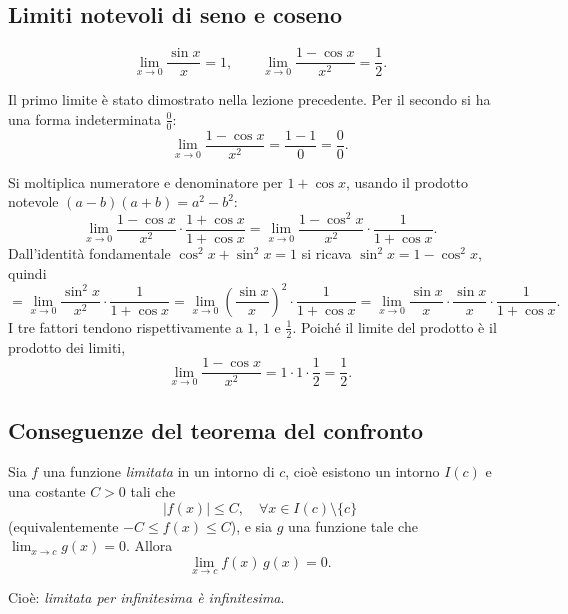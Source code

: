 \documentclass[11pt,a4paper]{article}
\begin{document}
\subsection{Limiti notevoli di seno e coseno}

\begin{teorema}
\[
  \lim_{x\to 0}\frac{\sin x}{x} = 1, \qquad \lim_{x\to 0}\frac{1 - \cos x}{x^2} = \frac{1}{2}.
\]
\end{teorema}

Il primo limite è stato dimostrato nella lezione precedente. Per il secondo si ha una forma indeterminata $\frac{0}{0}$:
\[
  \lim_{x\to 0}\frac{1 - \cos x}{x^2} = \frac{1 - 1}{0} = \frac{0}{0}.
\]

\begin{esempio}
Si moltiplica numeratore e denominatore per $1 + \cos x$, usando il prodotto notevole $(a - b)(a + b) = a^2 - b^2$:
\[
  \lim_{x\to 0}\frac{1 - \cos x}{x^2}\cdot\frac{1 + \cos x}{1 + \cos x} = \lim_{x\to 0}\frac{1 - \cos^2 x}{x^2}\cdot\frac{1}{1 + \cos x}.
\]
Dall'identità fondamentale $\cos^2 x + \sin^2 x = 1$ si ricava $\sin^2 x = 1 - \cos^2 x$, quindi
\[
  = \lim_{x\to 0}\frac{\sin^2 x}{x^2}\cdot\frac{1}{1 + \cos x} = \lim_{x\to 0}\left(\frac{\sin x}{x}\right)^{2}\cdot\frac{1}{1 + \cos x}
  = \lim_{x\to 0}\frac{\sin x}{x}\cdot\frac{\sin x}{x}\cdot\frac{1}{1 + \cos x}.
\]
I tre fattori tendono rispettivamente a $1$, $1$ e $\frac{1}{2}$. Poiché il limite del prodotto è il prodotto dei limiti,
\[
  \lim_{x\to 0}\frac{1 - \cos x}{x^2} = 1\cdot 1\cdot\frac{1}{2} = \frac{1}{2}.
\]
\end{esempio}

\subsection{Conseguenze del teorema del confronto}

\begin{teorema}
Sia $f$ una funzione \emph{limitata} in un intorno di $c$, cioè esistono un intorno $I(c)$ e una costante $C > 0$ tali che
\[
  |f(x)| \le C, \quad \forall x \in I(c)\setminus\{c\}
\]
(equivalentemente $-C \le f(x) \le C$), e sia $g$ una funzione tale che $\displaystyle\lim_{x\to c} g(x) = 0$. Allora
\[
  \lim_{x\to c} f(x)\,g(x) = 0.
\]
\end{teorema}

Cioè: \emph{limitata per infinitesima è infinitesima}.
\end{document}
